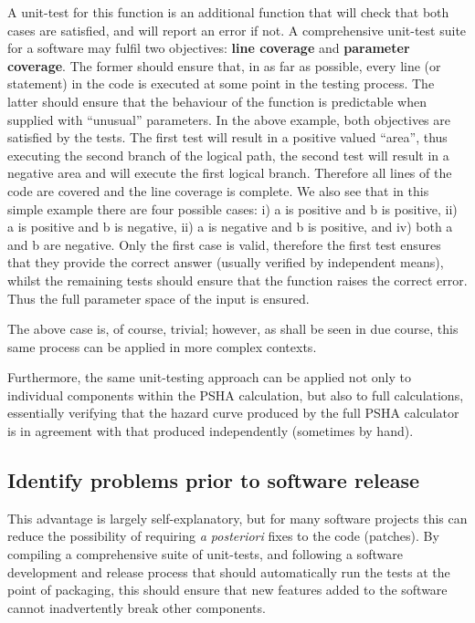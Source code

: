 A unit-test for this function is an additional function that will check that both cases are satisfied, and will report an error if not. 
A comprehensive unit-test suite for a software may fulfil two objectives: \textbf{line coverage} and \textbf{parameter coverage}. The former should ensure that, in as far as possible, every line (or statement) in the code is executed at some point in the testing process. The latter should ensure
that the behaviour of the function is predictable when supplied with ``unusual'' parameters. In the above example, both objectives are satisfied
by the tests. The first test will result in a positive valued ``area'',
thus executing the second branch of the logical path, the second test will
result in a negative area and will execute the first logical branch. %
Therefore all lines of the code are covered and the line coverage is complete. We also see that in this simple example there are four possible
cases: i) a is positive and b is positive, ii) a is positive and b is negative,  ii) a is negative and b is positive, and iv) both a and b are negative. Only the first case is valid, therefore the first test ensures that they provide the correct answer (usually verified by independent means), whilst the remaining tests should ensure that the function raises the correct error. Thus the full parameter space of the input is ensured.

The above case is, of course, trivial; however, as shall be seen in due
course, this same process can be applied in more complex contexts.

Furthermore, the same unit-testing approach can be applied not only to individual components within the PSHA calculation, but also to full calculations, essentially verifying that the hazard curve produced by the full PSHA calculator is in agreement with that produced independently (sometimes by hand).


\subsection{Identify problems prior to software release}
This advantage is largely self-explanatory, but for many software projects this can reduce the possibility of requiring \emph{a posteriori} fixes to
the code (patches). By compiling a comprehensive suite of unit-tests, and following a software development and release process that should automatically run the tests at the point of packaging, this should ensure that new features added to the software cannot inadvertently break other components.


